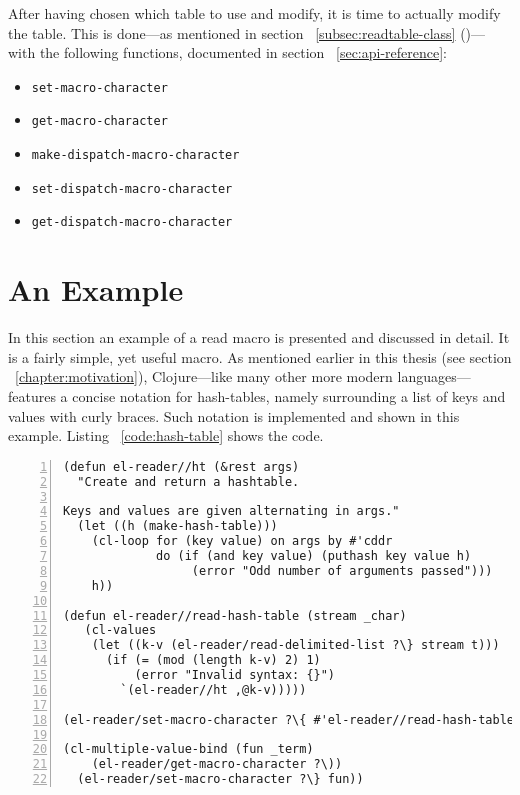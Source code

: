 \documentclass[a4paper,10pt,twoside]{report}
\newcommand{\fun}[1]{\texttt{#1}}
\begin{document}
After having chosen which table to use and modify, it is time to actually modify
the table.  This is done---as mentioned in section ~\ref{subsec:readtable-class}
()---with the following functions, documented in
section ~\ref{sec:api-reference}:

\begin{itemize}
\item \fun{set-macro-character} 
\item \fun{get-macro-character}
\item \fun{make-dispatch-macro-character}
\item \fun{set-dispatch-macro-character}
\item \fun{get-dispatch-macro-character}
\end{itemize}

\section{An Example}
\label{sec:example}

In this section an example of a read macro is presented and discussed in detail.
It is a fairly simple, yet useful macro.  As mentioned earlier in this thesis
(see section ~\ref{chapter:motivation}), Clojure---like many other more modern
languages---features a concise notation for hash-tables, namely surrounding a
list of keys and values with curly braces.  Such notation is implemented and
shown in this example.  Listing ~\ref{code:hash-table} shows the code.

\begin{lstlisting}[style=lispcode,label={code:hash-table},caption={Create syntax
    for hash-tables.},numbers=left]
(defun el-reader//ht (&rest args)
  "Create and return a hashtable.

Keys and values are given alternating in args."
  (let ((h (make-hash-table)))
    (cl-loop for (key value) on args by #'cddr
             do (if (and key value) (puthash key value h)
                  (error "Odd number of arguments passed")))
    h))

(defun el-reader//read-hash-table (stream _char)
   (cl-values
    (let ((k-v (el-reader/read-delimited-list ?\} stream t)))
      (if (= (mod (length k-v) 2) 1)
          (error "Invalid syntax: {}")
        `(el-reader//ht ,@k-v)))))

(el-reader/set-macro-character ?\{ #'el-reader//read-hash-table)

(cl-multiple-value-bind (fun _term)
    (el-reader/get-macro-character ?\))
  (el-reader/set-macro-character ?\} fun))
\end{lstlisting}
\end{document}
